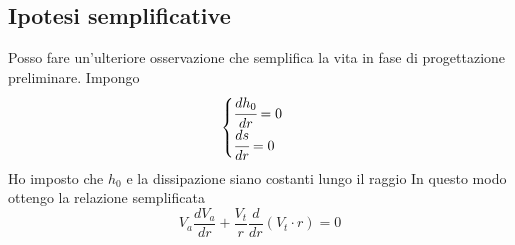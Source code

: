 \subsection{Ipotesi semplificative}
Posso fare un'ulteriore osservazione che semplifica la vita in fase di progettazione preliminare. Impongo
\begin{align*}
\begin{cases}
\cfrac{dh_0}{dr} = 0\\
\cfrac{ds}{dr} = 0
\end{cases}
\end{align*}
Ho imposto che $h_0$ e la dissipazione siano costanti lungo il raggio
In questo modo ottengo la relazione semplificata
\begin{equation}
\boxed{ V_a \frac{d V_a}{dr} + \frac{V_t}{r} \frac{d}{dr}(V_t \cdot r) = 0}
\label{eq:EquilibrioRadSemp}
\end{equation}
